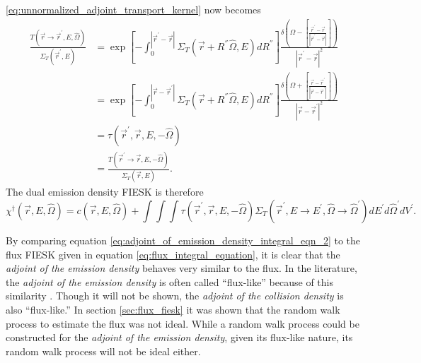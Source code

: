 \ref{eq:unnormalized_adjoint_transport_kernel} now becomes
\begin{align}
  \frac{T(\vec{r} \to \vec{r}^{'},E,\hat{\Omega})}{\Sigma_T(\vec{r}^{'},E)} & =
  \exp{\left[-\int_0^{|\vec{r}^{'} - \vec{r}|} 
    \Sigma_T \left(\vec{r} + R^{''}\hat{\Omega},E \right) dR^{''} 
    \right]} \frac{\delta \left(\Omega - \left[\frac{\vec{r}^{'} - \vec{r}}
      {|\vec{r}^{'} - \vec{r}|}\right]\right)}
       {|\vec{r}^{'} - \vec{r}|^2} \nonumber \\
       & = \exp{\left[-\int_0^{|\vec{r} - \vec{r}^{'}|} 
    \Sigma_T \left(\vec{r} + R^{''}\hat{\Omega},E \right) dR^{''} 
    \right]} \frac{\delta \left(\Omega + \left[\frac{\vec{r} - \vec{r}^{'}}
      {|\vec{r} - \vec{r}^{'}|}\right]\right)}
       {|\vec{r} - \vec{r}^{'}|^2} \nonumber \\
       & = \tau(\vec{r}^{'},\vec{r},E,-\hat{\Omega}) \\
       & = \frac{T(\vec{r}^{'} \to \vec{r},E,-\hat{\Omega})}
       {\Sigma_T(\vec{r},E)}.
\end{align}
The dual emission density FIESK is therefore
\begin{equation}
  \chi^{\dagger}(\vec{r},E,\hat{\Omega}) =  c(\vec{r},E,\hat{\Omega}) +
  \int\int\int  \tau(\vec{r}^{'},\vec{r},E,-\hat{\Omega}) 
  \Sigma_T(\vec{r}^{'},E \to E^{'},\hat{\Omega} \to \hat{\Omega}^{'})
  dE^{'}d\hat{\Omega}^{'}dV^{'}.
  \label{eq:adjoint_of_emission_density_integral_eqn_2}
\end{equation}
 
By comparing equation \ref{eq:adjoint_of_emission_density_integral_eqn_2} to 
the flux FIESK given in equation \ref{eq:flux_integral_equation}, it is clear 
that the \textit{adjoint of the emission density} behaves very similar to the 
flux. In the literature, the \textit{adjoint of the emission density} is often 
called ``flux-like'' because of this similarity \citep{hoogenboom_adjoint_1977}.
Though it will not be shown, the \textit{adjoint of the collision density} is 
also ``flux-like.'' In section \ref{sec:flux_fiesk} it was shown that the random
walk process to estimate the flux was not ideal. While a random walk process 
could be constructed for the \textit{adjoint of the emission density}, given its
flux-like nature, its random walk process will not be ideal either. 

